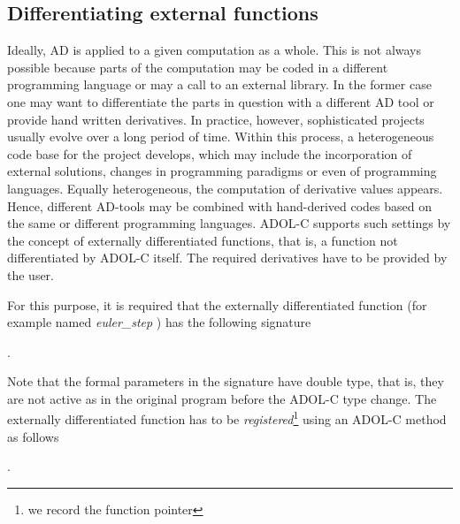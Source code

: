 \documentclass[11pt,twoside]{article}
\begin{document}
\subsection{Differentiating external functions}
%
Ideally, AD is applied to a given computation as a whole.
This is not always possible because parts of the computation may 
be coded in a different programming language or may a call to 
an external library. 
In the former case one may want to differentiate the parts in 
question with a different AD tool or provide hand written derivatives. 
In practice, however, sophisticated projects usually evolve over a long period of time.
Within this process, a heterogeneous code base for the project
develops, which may include the incorporation of external solutions,
changes in programming paradigms or even of programming languages.
Equally heterogeneous, the computation of derivative values appears.
Hence, different \mbox{AD-tools} may be combined with hand-derived
codes based on the same or different programming languages. 
ADOL-C supports such settings by the concept of externally
differentiated functions, that is, a function
not differentiated by ADOL-C itself. The required derivatives
have to be provided by the user.

For this purpose, it is required that the externally differentiated
function (for example named {\sf\em euler\_step} ) has the following signature
\smallskip

\noindent
\hspace*{2cm}{\sf int euler\_step(short tapeId, int m, int n, double *x, double *y);} .
\medskip

\noindent
Note that the formal parameters in the signature have {\sf double} type, that is, 
they are not active as in the original program before the ADOL-C type change.
The externally differentiated function has to
be {\em registered}\footnote{we record the function pointer} using an \mbox{ADOL-C} method as follows
\smallskip

\noindent
\hspace*{2cm}{\sf ext\_diff\_fct *edf = reg\_ext\_fct(outerTapeId, extTapeId, euler\_step);} .
\smallskip
\end{document}

